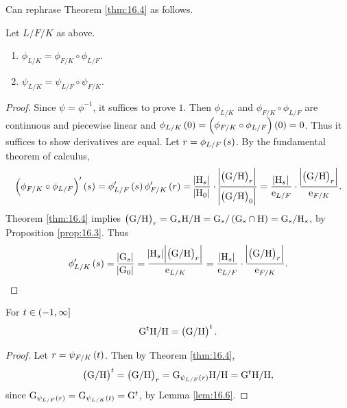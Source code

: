 Can rephrase Theorem \ref{thm:16.4} as follows.

\begin{lemma}
\label{lem:16.6}
Let $ L / F / K $ as above.
\begin{enumerate}
\item $ \phi_{L / K} = \phi_{F / K} \circ \phi_{L / F} $.
\item $ \psi_{L / K} = \psi_{L / F} \circ \psi_{F / K} $.
\end{enumerate}
\end{lemma}

\begin{proof}
Since $ \psi = \phi^{-1} $, it suffices to prove $ 1 $. Then $ \phi_{L / K} $ and $ \phi_{F / K} \circ \phi_{L / F} $ are continuous and piecewise linear and $ \phi_{L / K}\br{0} = \br{\phi_{F / K} \circ \phi_{L / F}}\br{0} = 0 $. Thus it suffices to show derivatives are equal. Let $ r = \phi_{L / F}\br{s} $. By the fundamental theorem of calculus,
$$ \br{\phi_{F / K} \circ \phi_{L / F}}'\br{s} = \phi_{L / F}'\br{s}\phi_{F / K}'\br{r} = \dfrac{\abs{\H_s}}{\abs{\H_0}} \cdot \dfrac{\abs{\br{\G / \H}_r}}{\abs{\br{\G / \H}_0}} = \dfrac{\abs{\H_s}}{\e_{L / F}} \cdot \dfrac{\abs{\br{\G / \H}_r}}{\e_{F / K}}. $$
Theorem \ref{thm:16.4} implies $ \br{\G / \H}_r = \G_s\H / \H = \G_s / \br{\G_s \cap \H} = \G_s / \H_s $, by Proposition \ref{prop:16.3}. Thus
$$ \phi_{L / K}'\br{s} = \dfrac{\abs{\G_s}}{\abs{\G_0}} = \dfrac{\abs{\H_s}\abs{\br{\G / \H}_r}}{\e_{L / K}} = \dfrac{\abs{\H_s}}{\e_{L / F}} \cdot \dfrac{\abs{\br{\G / \H}_r}}{\e_{F / K}}. $$
\end{proof}

\begin{corollary}
For $ t \in \intoc{-1, \infty} $
$$ \G^t\H / \H = \br{\G / \H}^t. $$
\end{corollary}

\begin{proof}
Let $ r = \psi_{F / K}\br{t} $. Then by Theorem \ref{thm:16.4},
$$ \br{\G / \H}^t = \br{\G / \H}_r = \G_{\psi_{L / F}\br{r}}\H / \H = \G^t\H / \H, $$
since $ \G_{\psi_{L / F}\br{r}} = \G_{\psi_{L / K}\br{t}} = \G^t $, by Lemma \ref{lem:16.6}.
\end{proof}

